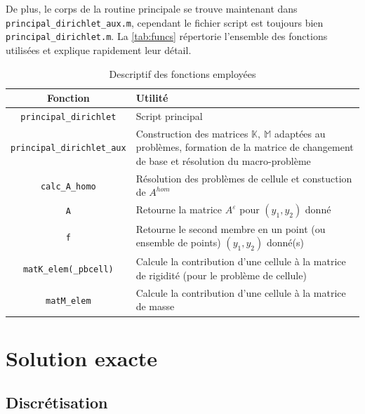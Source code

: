 \documentclass[11pt]{article}
\newcommand{\K}{\mathbb{K}}
\newcommand{\M}{\mathbb{M}}
\newcommand{\Ah}{A^{hom}}
\begin{document}
De plus, le corps de la routine principale se trouve maintenant dans \texttt{principal\_dirichlet\_aux.m}, cependant le fichier script est toujours bien
\texttt{principal\_dirichlet.m}. La \autoref{tab:funcs} répertorie l'ensemble des fonctions utilisées et explique rapidement leur détail. 

\begin{table}
  \centering
  \begin{tabular}{c|p{}}
    Fonction                           & Utilité                                                                                      \\
    \hline
    \texttt{principal\_dirichlet}      & Script principal                                                                             \\
    \hline
    \texttt{principal\_dirichlet\_aux} & Construction des matrices $\K,~\M$ adaptées au problèmes, formation de la matrice de changement de base et
                                         résolution du macro-problème                                                                 \\
    \hline
    \texttt{calc\_A\_homo}             & Résolution des problèmes de cellule et constuction de $\Ah$                                  \\
    \hline
    \texttt{A}                         & Retourne la matrice $A^\varepsilon$ pour $(y_1, y_2)$ donné                                  \\
    \hline
    \texttt{f}                         & Retourne le second membre en un point (ou ensemble de points)  $(y_1, y_2)$ donné(s)         \\
    \hline
    \texttt{matK\_elem(\_pbcell)}      & Calcule la contribution d'une cellule à la matrice de rigidité (pour le problème de cellule) \\
    \hline
    \texttt{matM\_elem}                & Calcule la contribution d'une cellule à la matrice de masse
  \end{tabular}
  \caption{Descriptif des fonctions employées}
  \label{tab:funcs}
\end{table}

\section{Solution exacte}

\subsection{Discrétisation}
\end{document}
